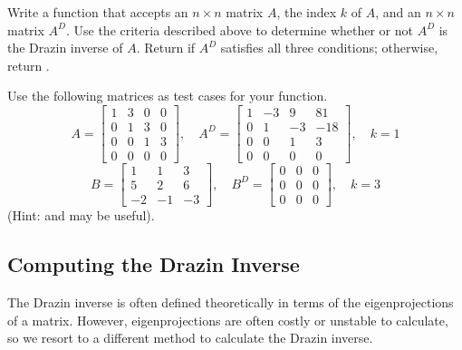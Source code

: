 \begin{problem} %
Write a function that accepts an $n \times n$ matrix $A$, the index $k$ of $A$, and an $n \times n$ matrix $A^D$.
Use the criteria described above to determine whether or not $A^D$ is the Drazin inverse of $A$.
Return  if $A^D$ satisfies all three conditions; otherwise, return .

Use the following matrices as test cases for your function.
\[
A = \left[\begin{array}{cccc}
1 & 3 & 0 & 0 \\
0 & 1 & 3 & 0 \\
0 & 0 & 1 & 3 \\
0 & 0 & 0 & 0
\end{array}\right],
\quad
A^D = \left[\begin{array}{cccc}
1 & -3 & 9 & 81 \\
0 & 1 & -3 & -18 \\
0 & 0 & 1 & 3 \\
0 & 0 & 0 & 0
\end{array}\right],
\quad
k = 1
\]
%
\[
B = \left[\begin{array}{ccc}
 1 &  1 &  3 \\
 5 &  2 &  6 \\
-2 & -1 & -3
\end{array}\right],
\quad B^D = \left[\begin{array}{ccc}
0 & 0 & 0 \\
0 & 0 & 0 \\
0 & 0 & 0
\end{array}\right],
\quad
k = 3
\]
(Hint:  and  may be useful).
\label{prob:test-drazin}
\end{problem}

\subsection*{Computing the Drazin Inverse} %

The Drazin inverse is often defined theoretically in terms of the eigenprojections of a matrix.
However, eigenprojections are often costly or unstable to calculate, so we resort to a different method to calculate the Drazin inverse.

